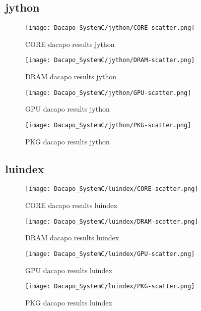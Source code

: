 \documentclass{article}
\begin{document}
\subsection{jython}
    \begin{figure}[H]
    	\centering
    	\texttt{[image: Dacapo\_SystemC/jython/CORE-scatter.png]}
    	\caption{CORE dacapo results jython}
    	\label{fig:jython-CORE}
    \end{figure}
        \begin{figure}[H]
    	\centering
    	\texttt{[image: Dacapo\_SystemC/jython/DRAM-scatter.png]}
    	\caption{DRAM dacapo results jython}
    	\label{fig:fop-jython}
    \end{figure}
    \begin{figure}[H]
    	\centering
    	\texttt{[image: Dacapo\_SystemC/jython/GPU-scatter.png]}
    	\caption{GPU dacapo results jython}
    	\label{fig:jython-GPU}
    \end{figure}
    \begin{figure}[H]
    	\centering
    	\texttt{[image: Dacapo\_SystemC/jython/PKG-scatter.png]}
    	\caption{PKG dacapo results jython}
    	\label{fig:jython-PKG}
    \end{figure}

\subsection{luindex}
    \begin{figure}[H]
    	\centering
    	\texttt{[image: Dacapo\_SystemC/luindex/CORE-scatter.png]}
    	\caption{CORE dacapo results luindex}
    	\label{fig:luindex-CORE}
    \end{figure}
        \begin{figure}[H]
    	\centering
    	\texttt{[image: Dacapo\_SystemC/luindex/DRAM-scatter.png]}
    	\caption{DRAM dacapo results luindex}
    	\label{fig:luindex-DRAM}
    \end{figure}
    \begin{figure}[H]
    	\centering
    	\texttt{[image: Dacapo\_SystemC/luindex/GPU-scatter.png]}
    	\caption{GPU dacapo results luindex}
    	\label{fig:fop-GPU}
    \end{figure}
    \begin{figure}[H]
    	\centering
    	\texttt{[image: Dacapo\_SystemC/luindex/PKG-scatter.png]}
    	\caption{PKG dacapo results luindex}
    	\label{fig:luindex-PKG}
    \end{figure}
\end{document}

